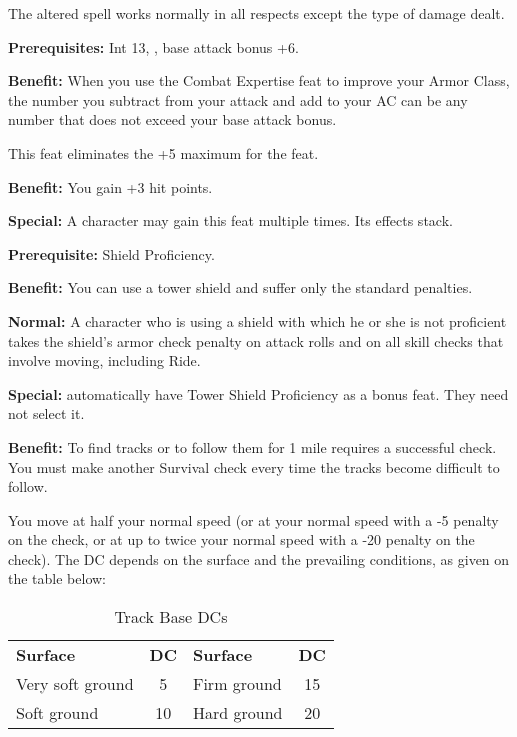 The altered spell works normally in all respects except the type of damage dealt.


\textbf{Prerequisites:} Int 13, , base attack bonus +6.

\textbf{Benefit:} When you use the Combat Expertise feat to improve your Armor 
Class, the number you subtract from your attack and add to your AC can be any number 
that does not exceed your base attack bonus.

This feat eliminates the +5 maximum for the  feat. 


\textbf{Benefit:} You gain +3 hit points.

\textbf{Special:} A character may gain this feat multiple times. Its effects stack.


\textbf{Prerequisite:} Shield Proficiency.

\textbf{Benefit:} You can use a tower shield and suffer only the standard penalties.

\textbf{Normal:} A character who is using a shield with which he or she is not 
proficient takes the shield's armor check penalty on attack rolls and on all skill 
checks that involve moving, including Ride.

\textbf{Special:}  automatically have Tower Shield Proficiency as a bonus 
feat. They need not select it.


\textbf{Benefit:} To find tracks or to follow them for 1 mile requires a successful 
 check. You must make another Survival check every time the tracks become 
difficult to follow.

You move at half your normal speed (or at your normal speed with a -5 penalty on 
the check, or at up to twice your normal speed with a -20 penalty on the check). 
The DC depends on the surface and the prevailing conditions, as given on the table 
below:

\begin{table}[htb]
\caption{Track Base DCs}
\centering
\begin{tabular}{l c l c}
\textbf{Surface} & \textbf{DC} & \textbf{Surface} & \textbf{DC}\\
Very soft ground & 5 & Firm ground & 15\\
Soft ground & 10 & Hard ground & 20\\
\end{tabular}
\end{table}

